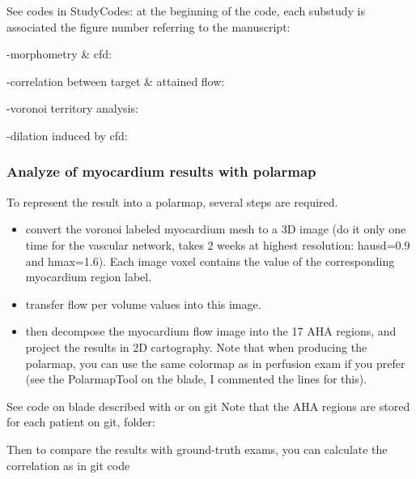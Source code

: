 \documentclass[a4paper, 11pt]{article} %
\begin{document}
See codes in StudyCodes: at the beginning of the code, each substudy is associated the figure number referring to the manuscript:

-morphometry \& cfd:


-correlation between target \& attained flow:


-voronoi territory analysis:

 
-dilation induced by cfd: 



\subsubsection{Analyze of myocardium results with polarmap}
To represent the result into a polarmap, several steps are required.
\begin{itemize}
\item convert the voronoi labeled myocardium mesh to a 3D image (do it only one time for the vascular network, takes 2 weeks at highest resolution: hausd=0.9 and hmax=1.6). Each image voxel contains the value of the corresponding myocardium region label.
\item transfer flow per volume values into this image.
\item then decompose the myocardium flow image into the 17 AHA regions, and project the results in 2D cartography. Note that when producing the polarmap, you can use the same colormap as in perfusion exam if you prefer (see the PolarmapTool on the blade, I commented the lines for this).
\end{itemize}
See code on blade described with  or on git 
Note that the AHA regions are stored for each patient on git, folder:


Then to compare the results with ground-truth exams, you can calculate the correlation as in git code 
\end{document}
